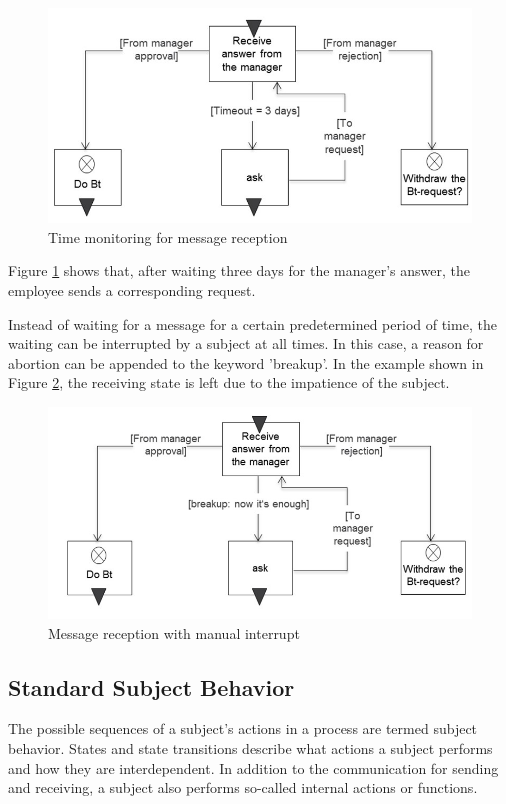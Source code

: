\begin{figure}[htbp]
	\centering
	\includegraphics[width=0.7\linewidth]{Figures/Ontology/SubjectExecution/ReceiveStateTimer}
	\caption[Time monitoring for message reception]{Time monitoring for message reception}
	\label{fig:receivestatetimer}
\end{figure}

Figure \ref{fig:receivestatetimer} shows that, after waiting three days for the manager's answer, the employee sends a corresponding request.

Instead of waiting for a message for a certain predetermined period of time, the waiting can be interrupted by a subject at all times. In this case, a reason for abortion can be appended to the keyword 'breakup'. In the example shown in Figure \ref{fig:receivestatebreak}, the receiving state is left due to the impatience of the subject.

\begin{figure}[htbp]
	\centering
	\includegraphics[width=0.7\linewidth]{Figures/Ontology/SubjectExecution/ReceiveStateBreak}
	\caption[Message reception with manual interrupt]{Message reception with manual interrupt}
	\label{fig:receivestatebreak}
\end{figure}

\subsection{Standard Subject Behavior}

The possible sequences of a subject's actions in a process are termed subject behavior. States and state transitions describe what actions a subject performs and how they are interdependent. In addition to the communication for sending and receiving, a subject also performs so-called internal actions or functions.

